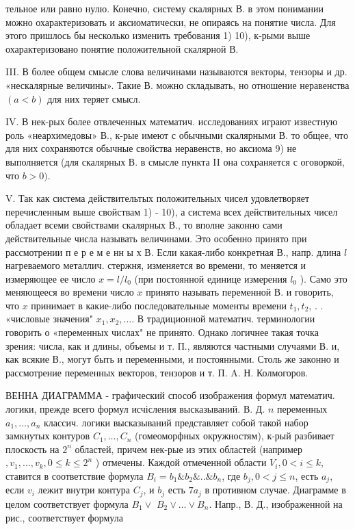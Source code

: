 \documentclass[10pt]{article}
\begin{document}
тельное или равно нулю. Конечно, систему скалярных В. в этом понимании можно охарактеризовать и аксиоматически, не опираясь на понятие числа. Для этого пришлось бы несколько изменить требования 1) 10), к-рыми выше охарактеризовано понятие положительной скалярной В.



III. В более общем смысле слова величинами называются векторы, тензоры и др. «нескалярные величины». Такие В. можно складывать, но отношение неравенства $(a<b)$ для них теряет смысл.



IV. В нек-рых более отвлеченных математич. исследованиях играют известную роль «неархимедовы» В., к-рые имеют с обычными скалярными В. то общее, что для них сохраняются обычные свойства неравенств, но аксиома 9) не выполняется (для скалярных В. в смысле пункта II она сохраняется с оговоркой, что $b>0)$.



V. Так как система действительтых положительных чисел удовлетворяет перечисленным выше свойствам 1) - 10), а система всех действительных чисел обладает всеми свойствами скалярных В., то вполне законно сами действительные числа называть величинами. Это особенно принято при рассмотрении п е р е м е нн ы х В. Если какая-либо конкретная В., напр. длина $l$ нагреваемого металлич. стержня, изменяется во времени, то меняется и измеряющее ее число $x=l / l_{0}$ (при постоянной единице измерения $l_{0}$ ). Само это меняющееся во времени число $x$ принято называть переменной В. и говорить, что $x$ принимает в какие-либо последовательные моменты времени $t_{1}, t_{2}$, . . «числовые значения" $x_{1}, x_{2}, \ldots$. В традиционной математич. терминологии говорить о «переменных числах" не принято. Однако логичнее такая точка зрения: числа, как и длины, объемы и т. П., являются частными случаями В. и, как всякие В., могут быть и переменными, и постоянными. Столь же законно и рассмотрение переменных векторов, тензоров и т. П. A. Н. Колмогоров.



ВЕННА ДИАГРАММА - графический способ изображения формул математич. логики, прежде всего формул исчісления высказываний. В. Д. $n$ переменных $a_{1}, \ldots, a_{n}$ классич. логики высказываний представляет собой такой набор замкнутых контуров $C_{1}, \ldots, C_{n}$ (гомеоморфных окружностям), к-рый разбивает плоскость на $2^{n}$ областей, причем нек-рые из этих областей (например $, v_{1}, \ldots, v_{k}, 0 \leqslant k \leqslant 2^{n}$ ) отмечены. Каждой отмеченной области $V_{i}, 0<i \leqslant k$, ставится в соответствие формула $B_{i}=b_{1} \& b_{2} \& . . \& b_{n}$, где $b_{j}, 0<j \leqslant n$, есть $a_{j}$, если $v_{i}$ лежит внутри контура $C_{j}$, и $b_{j}$ есть $7 a_{j}$ в противном случае. Диаграмме в целом соответствует формула $B_{1} \vee$ $B_{2} \vee \ldots \vee B_{n}$. Напр., В. Д., изображенной на рис., соответствует формула
\end{document}
